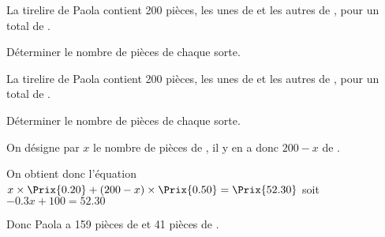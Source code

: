 \begin{exercice*}
    La tirelire de Paola contient 200 pièces, les unes de  et les autres de , pour un total de .

    Déterminer le nombre de pièces de chaque sorte.
\end{exercice*}
\begin{corrige}
    La tirelire de Paola contient 200 pièces, les unes de  et les autres de , pour un total de .

    Déterminer le nombre de pièces de chaque sorte.

    {\color{red} On désigne par $x$ le nombre de pièces de , il y en a donc $200-x$ de .
    
    
    On obtient donc l'équation $x\times\Prix{0.20} + (200-x)\times\Prix{0.50}=\Prix{52.30}$ soit $\num{-0.3}x+100=\num{52.30}$
    

    Donc Paola a 159 pièces de  et 41 pièces de .
}
\end{corrige}

